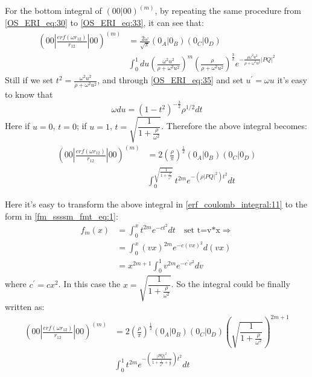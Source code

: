 For the bottom integral of $(00|00)^{(m)}$, by repeating the same procedure from 
\ref{OS_ERI_eq:30} to \ref{OS_ERI_eq:33}, it can see that:
\begin{equation}
 \begin{split}
 (00|\frac{erf(\omega r_{12})}{r_{12}}|00)^{(m)} &=\frac{2\omega}{\sqrt{\pi}}(0_{A}|0_{B})(0_{C}|0_{D}) \\
 &\int_{0}^{1} du \left( \frac{\omega^{2}u^{2}}{\rho+\omega^{2}u^{2}}\right)^{m}
 \left(\frac{\rho}{\rho+\omega^{2}u^{2}}\right)^{\frac{3}{2}}
 e^{-\frac{\rho \omega^{2}u^{2}}{\rho+ \omega^{2}u^{2}}|PQ|^{2}} 
 \end{split}
\label{erf_coulomb_integral:10}
\end{equation}
Still if we set $t^{2} = \frac{\omega^{2}u^{2}}{\rho+ \omega^{2}u^{2}}$, and through 
\ref{OS_ERI_eq:35} and set $u^{'} = \omega u$ it's easy to know that 
\begin{equation}
 \omega du = (1-t^{2})^{-\frac{3}{2}}\rho^{1/2} dt
\end{equation}
Here if $u=0$, $t = 0$; if $u = 1$, $t = \sqrt{\dfrac{1}{1+\frac{\rho}{\omega^{2}}}}$. Therefore
the above integral becomes:
\begin{equation}
 \begin{split}
 (00|\frac{erf(\omega r_{12})}{r_{12}}|00)^{(m)} &= 
 2\left( \frac{\rho}{\pi}\right)^{\frac{1}{2}}(0_{A}|0_{B})(0_{C}|0_{D}) \\
 &\int^{\sqrt{\frac{1}{1+\frac{\rho}{\omega^{2}}}}}_{0} t^{2m} e^{-(\rho|PQ|^{2})t^{2}} dt 
 \end{split}
\label{erf_coulomb_integral:11}
\end{equation}

Here it's easy to transform the above integral in \ref{erf_coulomb_integral:11}
to the form in \ref{fm_ssssm_fmt_eq:1}:
\begin{equation}
 \begin{split}
  f_{m}(x) &= \int^{x}_{0} t^{2m} e^{-ct^{2}} dt \quad \text{set t=v*x} \Rightarrow\\
           &= \int^{x}_{0} (vx)^{2m} e^{-c(vx)^{2}} d(vx) \\
           &= x^{2m+1} \int_{0}^{1} v^{2m} e^{-c^{'}v^{2}} dv
 \end{split}
 \label{erf_coulomb_integral:12}
\end{equation}
where $c^{'} = cx^{2}$. In this case the $x = \sqrt{\dfrac{1}{1+\frac{\rho}{\omega^{2}}}}$. So the integral
could be finally written as:
\begin{equation}
 \begin{split}
 (00|\frac{erf(\omega r_{12})}{r_{12}}|00)^{(m)} &= 
 2\left( \frac{\rho}{\pi}\right)^{\frac{1}{2}}(0_{A}|0_{B})(0_{C}|0_{D})
 \left( \sqrt{\dfrac{1}{1+\frac{\rho}{\omega^{2}}}}\right)^{2m+1}  \\
 &\int^{1}_{0} t^{2m} e^{-\left( \frac{|PQ|^{2}}{1+\frac{1}{\omega^{2}} + 
 \frac{1}{\rho}}\right) t^{2}} dt 
 \end{split}
\label{erf_coulomb_integral:13}
\end{equation}

